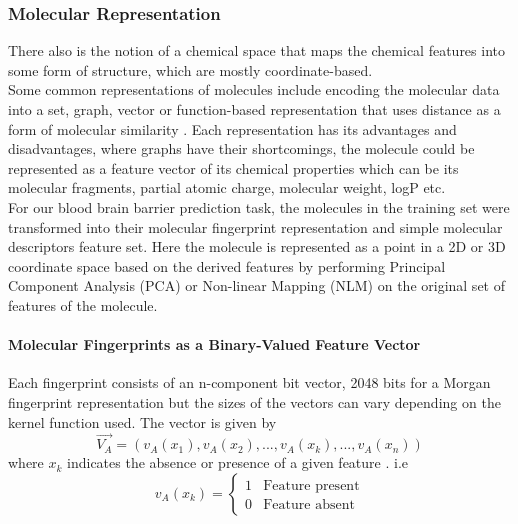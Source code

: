 \documentclass[a4paper,12pt]{report}
\begin{document}
				\subsubsection{Molecular Representation} 
				There also is the notion of a chemical space that maps the chemical features into some form of structure, which are mostly coordinate-based. \\
				Some common representations of molecules include encoding the molecular data into a set, graph, vector or function-based representation that uses distance as a form of molecular similarity \cite{Jurgen2004}. Each representation has its advantages and disadvantages, where graphs have their shortcomings, the molecule could be represented as a feature vector of its chemical properties which can be its molecular fragments, partial atomic charge, molecular weight, logP etc. \\
				For our blood brain barrier prediction task, the molecules in the training set were transformed into their molecular fingerprint representation and simple molecular descriptors feature set. Here the molecule is represented as a point in a 2D or 3D coordinate space based on the derived features by performing Principal Component Analysis (PCA) or Non-linear Mapping (NLM) on the original set of features of the molecule.  
				\paragraph{Molecular Fingerprints as a Binary-Valued Feature Vector}
				Each fingerprint consists of an n-component bit vector, 2048 bits for a Morgan fingerprint representation but the sizes of the vectors can vary depending on the kernel function used. The vector is given by 
					\begin{equation}
					\vec{V_A} = (v_A(x_1), v_A(x_2),...,v_A(x_k),...,v_A(x_n))
					\end{equation}
				where $x_k$ indicates the absence or presence of a given feature \cite{Jurgen2004}. i.e
					\begin{equation}
					v_A(x_k) = 
					\begin{cases}
					1 & \text{Feature present} \\
					0 & \text{Feature absent}
					\end{cases}
					\end{equation}
\end{document}
